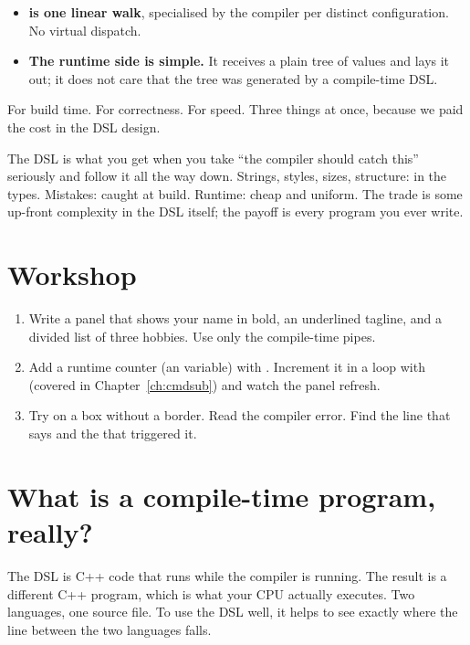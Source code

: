 \begin{itemize}[leftmargin=*]
  \item \textbf{ is one linear walk}, specialised by
    the compiler per distinct configuration. No virtual dispatch.
  \item \textbf{The runtime side is simple.} It receives a plain
    tree of  values and lays it out; it does not
    care that the tree was generated by a compile-time DSL.
\end{itemize}

For build time. For correctness. For speed. Three things at once,
because we paid the cost in the DSL design.

\begin{idea}
The \maya{} DSL is what you get when you take ``the compiler should
catch this'' seriously and follow it all the way down. Strings,
styles, sizes, structure: in the types. Mistakes: caught at build.
Runtime: cheap and uniform. The trade is some up-front complexity in
the DSL itself; the payoff is every \maya{} program you ever write.
\end{idea}

\section*{Workshop}

\begin{enumerate}[leftmargin=*]
  \item Write a panel that shows your name in bold, an underlined
    tagline, and a divided list of three hobbies. Use only the
    compile-time pipes.
  \item Add a runtime counter (an  variable) with
    . Increment it in a loop with
     (covered in Chapter~\ref{ch:cmdsub}) and
    watch the panel refresh.
  \item Try  on a box without a border. Read
    the compiler error. Find the line that says  and the  that triggered it.
\end{enumerate}

\section{What is a compile-time program, really?}

The DSL is C++ code that runs while the compiler is running. The
result is a different C++ program, which is what your CPU
actually executes. Two languages, one source file. To use the DSL
well, it helps to see exactly where the line between the two
languages falls.

